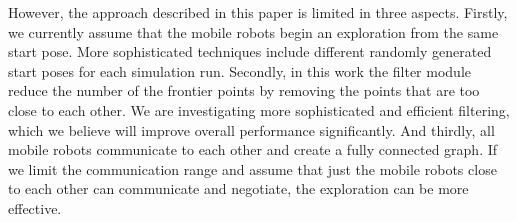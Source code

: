 \documentclass[letterpaper, 10 pt, conference]{ieeeconf}  %
\begin{document}
However, the approach described in this paper is limited in three aspects. Firstly, we currently assume that the mobile robots begin an exploration from the same start pose. More sophisticated techniques include different randomly generated start poses for each simulation run. Secondly, in this work the filter module reduce the number of the frontier points by removing the points that are too close to each other. We are investigating more sophisticated and efficient filtering, which we believe will improve overall performance significantly. And thirdly, all mobile robots communicate to each other and create a fully connected graph. If we limit the communication range and assume that just the mobile robots close to each other can communicate and negotiate, the exploration can be more effective. 

\addtolength{\textheight}{-12cm}   %

\end{document}
